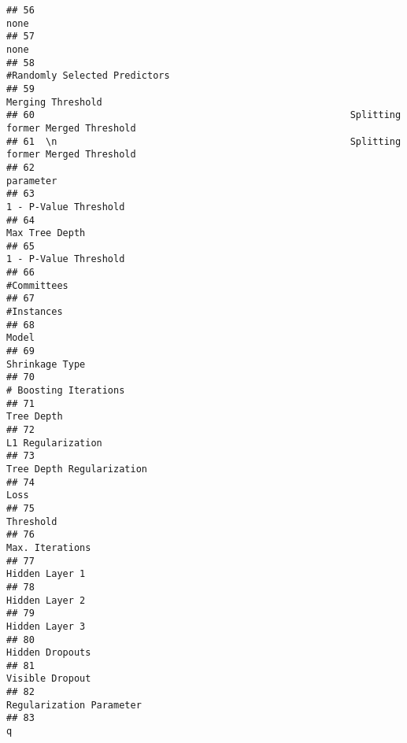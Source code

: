 \documentclass[
]{article}
\begin{document}
\begin{verbatim}
## 56                                                                                     none
## 57                                                                                     none
## 58                                                            #Randomly Selected Predictors
## 59                                                                        Merging Threshold
## 60                                                        Splitting former Merged Threshold
## 61  \n                                                    Splitting former Merged Threshold
## 62                                                                                parameter
## 63                                                                    1 - P-Value Threshold
## 64                                                                           Max Tree Depth
## 65                                                                    1 - P-Value Threshold
## 66                                                                              #Committees
## 67                                                                               #Instances
## 68                                                                                    Model
## 69                                                                           Shrinkage Type
## 70                                                                    # Boosting Iterations
## 71                                                                               Tree Depth
## 72                                                                        L1 Regularization
## 73                                                                Tree Depth Regularization
## 74                                                                                     Loss
## 75                                                                                Threshold
## 76                                                                          Max. Iterations
## 77                                                                           Hidden Layer 1
## 78                                                                           Hidden Layer 2
## 79                                                                           Hidden Layer 3
## 80                                                                          Hidden Dropouts
## 81                                                                          Visible Dropout
## 82                                                                 Regularization Parameter
## 83                                                                                        q

\end{verbatim}
\end{document}
